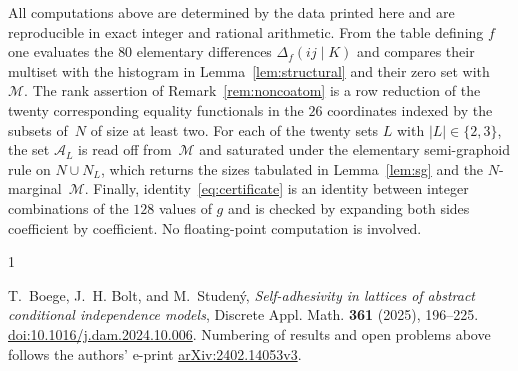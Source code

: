 \documentclass[11pt]{amsart}
\newcommand{\M}{\mathcal{M}}
\newcommand{\A}{\mathcal{A}}
\begin{document}
All computations above are determined by the data printed here and are
reproducible in exact integer and rational arithmetic. From the table
defining $f$ one evaluates the $80$ elementary differences
$\Delta_f(ij\mid K)$ and compares their multiset with the histogram in
Lemma~\ref{lem:structural} and their zero set with~$\M$. The rank assertion
of Remark~\ref{rem:noncoatom} is a row reduction of the twenty
corresponding equality functionals in the $26$ coordinates indexed by the
subsets of~$N$ of size at least two. For each of the twenty sets $L$ with
$|L|\in\{2,3\}$, the set $\A_L$ is read off from~$\M$ and saturated under
the elementary semi-graphoid rule on $N\cup N_L$, which returns the sizes
tabulated in Lemma~\ref{lem:sg} and the $N$-marginal~$\M$. Finally,
identity~\eqref{eq:certificate} is an identity between integer combinations
of the $128$ values of $g$ and is checked by expanding both sides
coefficient by coefficient. No floating-point computation is involved.

\begin{thebibliography}{1}

T.~Boege, J.~H. Bolt, and M.~Studen\'y,
\emph{Self-adhesivity in lattices of abstract conditional independence
models},
Discrete Appl. Math. \textbf{361} (2025), 196--225.
\href{https://doi.org/10.1016/j.dam.2024.10.006}
{doi:10.1016/j.dam.2024.10.006}.
Numbering of results and open problems above follows the authors' e-print
\href{https://arxiv.org/abs/2402.14053v3}{arXiv:2402.14053v3}.

\end{thebibliography}
\end{document}
